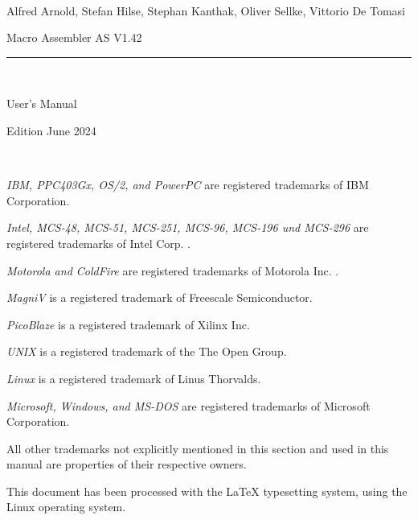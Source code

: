 \documentclass[12pt,twoside]{report}
\newcommand{\asname}{{AS}}
\begin{document}
\thispagestyle{empty}

\
\vspace{7cm}\par

\begin{raggedright}
{\large Alfred Arnold, Stefan Hilse, Stephan Kanthak, Oliver
 Sellke, Vittorio De Tomasi}
\vspace{1cm}\par
{\huge Macro Assembler \asname{} V1.42}\\
\rule{9.5cm}{0.3mm}\\
\vspace{2mm}\par
{\huge User's Manual}

\vspace{1cm}\par

{\large Edition June 2024}
\end{raggedright}

\clearpage
\thispagestyle{empty}

\ \vspace{5cm}

{\em IBM, PPC403Gx, OS/2, and PowerPC} are registered trademarks of IBM
Corporation.

{\em Intel, MCS-48, MCS-51, MCS-251, MCS-96, MCS-196 und MCS-296} are
registered trademarks of Intel Corp. .

{\em Motorola and ColdFire} are registered trademarks of Motorola Inc. .

{\em MagniV} is a registered trademark of Freescale Semiconductor.

{\em PicoBlaze} is a registered trademark of Xilinx Inc.

{\em UNIX} is a registered trademark of the The Open Group.

{\em Linux} is a registered trademark of Linus Thorvalds.

{\em Microsoft, Windows, and MS-DOS} are registered trademarks of
Microsoft Corporation.

All other trademarks not explicitly mentioned in this section and used in
this manual are properties of their respective owners.

\vspace{5cm}

This document has been processed with the LaTeX typesetting system, using
the Linux operating system.

\clearpage

\end{document}
